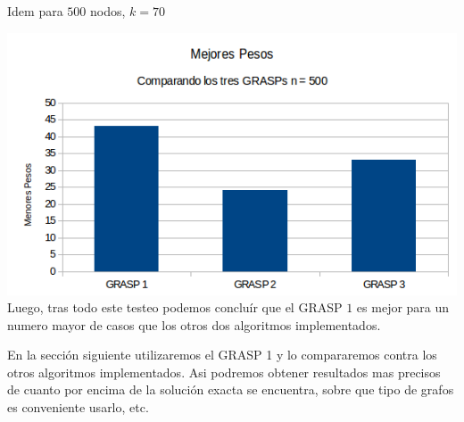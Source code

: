 Idem para $500$ nodos, $k = 70$

\includegraphics[scale=0.7]{Ej5/CompetenciaGRASPs3.png}\\

Luego, tras todo este testeo podemos concluír que el GRASP $1$ es mejor para un numero mayor de casos que los otros dos algoritmos implementados.

En la sección siguiente utilizaremos el GRASP 1 y lo compararemos contra los otros algoritmos implementados. Asi podremos obtener resultados mas precisos de cuanto por encima de la solución exacta se encuentra, sobre que tipo de grafos es conveniente usarlo, etc.